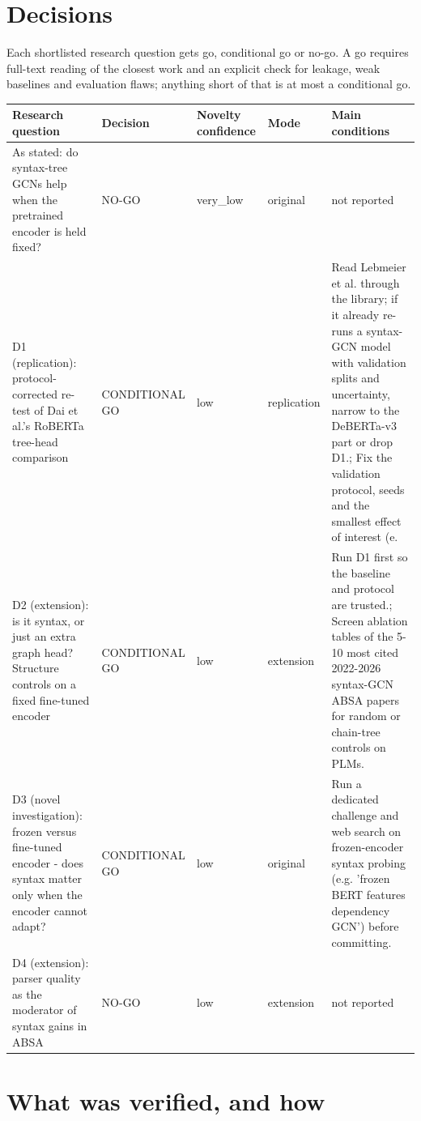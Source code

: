 \documentclass[11pt,a4paper]{article}
\begin{document}
\section{Decisions}

Each shortlisted research question gets go, conditional go or no-go. A go requires full-text reading of the closest work and an explicit check for leakage, weak baselines and evaluation flaws; anything short of that is at most a conditional go.

{\small
\begin{longtable}{>{\raggedright\arraybackslash}p{}>{\raggedright\arraybackslash}p{}>{\raggedright\arraybackslash}p{}>{\raggedright\arraybackslash}p{}>{\raggedright\arraybackslash}p{}}
\toprule
\textbf{Research question} & \textbf{Decision} & \textbf{Novelty confidence} & \textbf{Mode} & \textbf{Main conditions} \\
\midrule
\endhead
As stated: do syntax-tree GCNs help when the pretrained encoder is held fixed? & NO-GO & very\_low & original & not reported \\
D1 (replication): protocol-corrected re-test of Dai et al.'s RoBERTa tree-head comparison & CONDITIONAL GO & low & replication & Read Lebmeier et al. through the library; if it already re-runs a syntax-GCN model with validation splits and uncertainty, narrow to the DeBERTa-v3 part or drop D1.; Fix the validation protocol, seeds and the smallest effect of interest (e. \\
D2 (extension): is it syntax, or just an extra graph head? Structure controls on a fixed fine-tuned encoder & CONDITIONAL GO & low & extension & Run D1 first so the baseline and protocol are trusted.; Screen ablation tables of the 5-10 most cited 2022-2026 syntax-GCN ABSA papers for random or chain-tree controls on PLMs. \\
D3 (novel investigation): frozen versus fine-tuned encoder - does syntax matter only when the encoder cannot adapt? & CONDITIONAL GO & low & original & Run a dedicated challenge and web search on frozen-encoder syntax probing (e.g. 'frozen BERT features dependency GCN') before committing. \\
D4 (extension): parser quality as the moderator of syntax gains in ABSA & NO-GO & low & extension & not reported \\
\bottomrule
\end{longtable}
}

\section{What was verified, and how}
\end{document}
